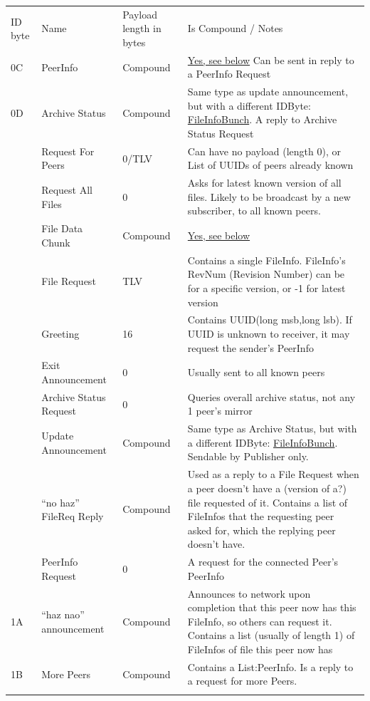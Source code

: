 \documentclass[12pt,a4paper,]{adreport}
\begin{document}
\begin{longtable}[c]{@{}llll@{}}
\toprule\addlinespace
ID byte & Name & Payload length in bytes & Is Compound / Notes
\\\addlinespace
\midrule\endhead
0C & PeerInfo & Compound & \hyperref[PeerInfo]{Yes, see below} Can be
sent in reply to a PeerInfo Request
\\\addlinespace
0D & Archive Status & Compound & Same type as update announcement, but
with a different IDByte: \hyperref[FileInfoBunch]{FileInfoBunch}. A
reply to Archive Status Request
\\\addlinespace
10 & Request For Peers & 0/TLV & Can have no payload (length 0), or List
of UUIDs of peers already known
\\\addlinespace
11 & Request All Files & 0 & Asks for latest known version of all files.
Likely to be broadcast by a new subscriber, to all known peers.
\\\addlinespace
12 & File Data Chunk & Compound & \hyperref[FileDataChunk]{Yes, see
below}
\\\addlinespace
13 & File Request & TLV & Contains a single FileInfo. FileInfo's RevNum
(Revision Number) can be for a specific version, or -1 for latest
version
\\\addlinespace
14 & Greeting & 16 & Contains UUID(long msb,long lsb). If UUID is
unknown to receiver, it may request the sender's PeerInfo
\\\addlinespace
15 & Exit Announcement & 0 & Usually sent to all known peers
\\\addlinespace
16 & Archive Status Request & 0 & Queries overall archive status, not
any 1 peer's mirror
\\\addlinespace
17 & Update Announcement & Compound & Same type as Archive Status, but
with a different IDByte: \hyperref[FileInfoBunch]{FileInfoBunch}.
Sendable by Publisher only.
\\\addlinespace
18 & ``no haz'' FileReq Reply & Compound & Used as a reply to a File
Request when a peer doesn't have a (version of a?) file requested of it.
Contains a list of FileInfos that the requesting peer asked for, which
the replying peer doesn't have.
\\\addlinespace
19 & PeerInfo Request & 0 & A request for the connected Peer's PeerInfo
\\\addlinespace
1A & ``haz nao'' announcement & Compound & Announces to network upon
completion that this peer now has this FileInfo, so others can request
it. Contains a list (usually of length 1) of FileInfos of file this peer
now has
\\\addlinespace
1B & More Peers & Compound & Contains a List:PeerInfo. Is a reply to a
request for more Peers.
\\\addlinespace
\bottomrule
\end{longtable}
\end{document}
